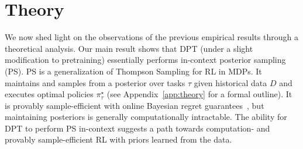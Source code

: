 \documentclass{article}
\newcommand{\macroName}{DPT}
\newcommand{\pistar}{\pi^{\star}}
\begin{document}
\section{Theory}\label{sec:theory}
We now shed light on the observations of the previous empirical results through a theoretical analysis. Our main result shows that DPT (under a slight modification to pretraining) essentially performs in-context posterior sampling (PS). PS is a generalization of Thompson Sampling for RL in MDPs. It maintains and samples from a posterior over tasks $\tau$ given historical data $D$ and executes optimal policies $\pistar_\tau$ (see Appendix~\ref{app:theory} for a formal outline). It is provably sample-efficient with online Bayesian regret guarantees~\citep{osband2013more}, but maintaining posteriors is generally computationally intractable. The ability for \macroName{} to perform PS in-context suggests a path towards computation- and provably sample-efficient RL with priors learned from the data.
\end{document}
